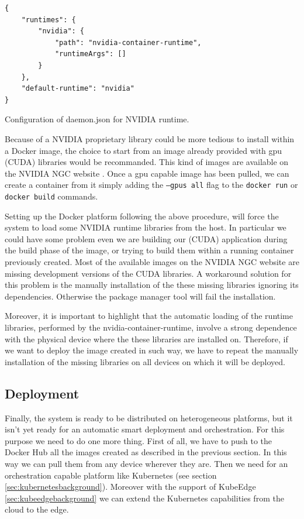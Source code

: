 \begin{listing}[tbp]
\begin{verbatim}
{
	"runtimes": {
		"nvidia": {
			"path": "nvidia-container-runtime",
			"runtimeArgs": []
		}
	},
	"default-runtime": "nvidia"
}
\end{verbatim}
\caption{Configuration of daemon.json for NVIDIA runtime.}
\label{lst:daemonconfig}
\end{listing}

Because of a NVIDIA proprietary library could be more tedious to install within a Docker image, the choice to start from an image already provided with gpu (CUDA) libraries would be recommanded. This kind of images are available on the NVIDIA NGC website \cite{nvidiangc}. Once a gpu capable image has been pulled, we can create a container from it simply adding the \texttt{--gpus all} flag to the \texttt{docker run} or \texttt{docker build} commands.

Setting up the Docker platform following the above procedure, will force the system to load some NVIDIA runtime libraries from the host. 
In particular we could have some problem even we are building our (CUDA) application during the build phase of the image, or trying to build them within a running container previously created. 
Most of the available images on the NVIDIA NGC website are missing development versions of the CUDA libraries. A workaround solution for this problem is the manually installation of the these missing libraries ignoring its dependencies. Otherwise the package manager tool will fail the installation.

Moreover, it is important to highlight that the automatic loading of the runtime libraries, performed by the nvidia-container-runtime, involve a strong dependence with the physical device where the these libraries are installed on. Therefore, if we want to deploy the image created in such way, we have to repeat the manually installation of the missing libraries on all devices on which it will be deployed.



\subsection{Deployment}\label{sec:deployment}
Finally, the system is ready to be distributed on heterogeneous platforms, but it isn't yet ready for an automatic smart deployment and orchestration.
For this purpose we need to do one more thing. First of all, we have to push to the Docker Hub all the images created as described in the previous section. In this way we can pull them from any device wherever they are. Then we need for an orchestration capable platform like Kubernetes (see section \ref{sec:kubernetesbackground}). Moreover with the support of KubeEdge \ref{sec:kubeedgebackground} we can extend the Kubernetes capabilities from the cloud to the edge.

